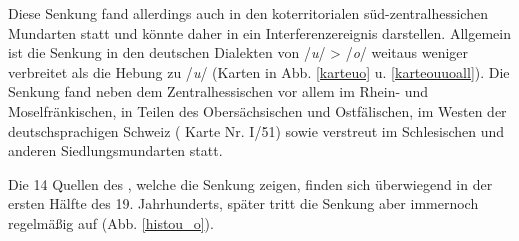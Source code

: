 
Diese Senkung fand allerdings auch in den koterritorialen süd-zentralhessichen Mundarten statt und könnte daher in  ein Interferenzereignis darstellen. Allgemein ist die Senkung in den deutschen Dialekten von /\textit{u}/ > /\textit{o}/ weitaus weniger verbreitet als die Hebung zu /\textit{u}/ (Karten in Abb. \ref{karteuo} u. \ref{karteouuoall}). Die Senkung fand neben dem Zentralhessischen vor allem im Rhein- und Moselfränkischen, in Teilen des Obersächsischen und Ostfälischen, im Westen der deutschsprachigen Schweiz ( Karte Nr. I/51) sowie verstreut im Schlesischen und anderen Siedlungsmundarten statt. 

Die 14 Quellen des , welche die Senkung zeigen, finden sich überwiegend in der ersten Hälfte des 19. Jahrhunderts, später tritt die Senkung aber immernoch regelmäßig auf (Abb. \ref{histou_o}). \\


